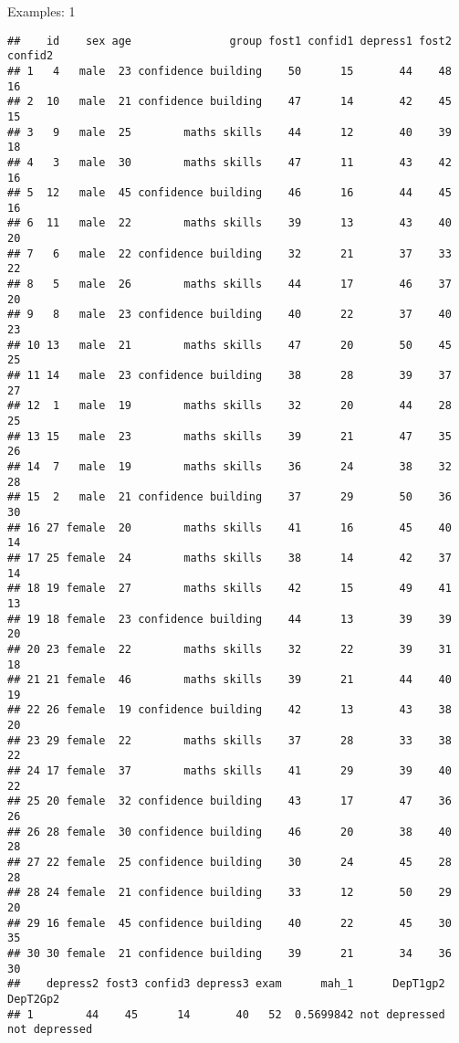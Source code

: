 \documentclass[
  ignorenonframetext,
]{beamer}
\begin{document}
\begin{frame}[fragile]{Examples: 1}
\begin{verbatim}
##    id    sex age               group fost1 confid1 depress1 fost2 confid2
## 1   4   male  23 confidence building    50      15       44    48      16
## 2  10   male  21 confidence building    47      14       42    45      15
## 3   9   male  25        maths skills    44      12       40    39      18
## 4   3   male  30        maths skills    47      11       43    42      16
## 5  12   male  45 confidence building    46      16       44    45      16
## 6  11   male  22        maths skills    39      13       43    40      20
## 7   6   male  22 confidence building    32      21       37    33      22
## 8   5   male  26        maths skills    44      17       46    37      20
## 9   8   male  23 confidence building    40      22       37    40      23
## 10 13   male  21        maths skills    47      20       50    45      25
## 11 14   male  23 confidence building    38      28       39    37      27
## 12  1   male  19        maths skills    32      20       44    28      25
## 13 15   male  23        maths skills    39      21       47    35      26
## 14  7   male  19        maths skills    36      24       38    32      28
## 15  2   male  21 confidence building    37      29       50    36      30
## 16 27 female  20        maths skills    41      16       45    40      14
## 17 25 female  24        maths skills    38      14       42    37      14
## 18 19 female  27        maths skills    42      15       49    41      13
## 19 18 female  23 confidence building    44      13       39    39      20
## 20 23 female  22        maths skills    32      22       39    31      18
## 21 21 female  46        maths skills    39      21       44    40      19
## 22 26 female  19 confidence building    42      13       43    38      20
## 23 29 female  22        maths skills    37      28       33    38      22
## 24 17 female  37        maths skills    41      29       39    40      22
## 25 20 female  32 confidence building    43      17       47    36      26
## 26 28 female  30 confidence building    46      20       38    40      28
## 27 22 female  25 confidence building    30      24       45    28      28
## 28 24 female  21 confidence building    33      12       50    29      20
## 29 16 female  45 confidence building    40      22       45    30      35
## 30 30 female  21 confidence building    39      21       34    36      30
##    depress2 fost3 confid3 depress3 exam      mah_1      DepT1gp2      DepT2Gp2
## 1        44    45      14       40   52  0.5699842 not depressed not depressed

\end{verbatim}
\end{frame}
\end{document}
